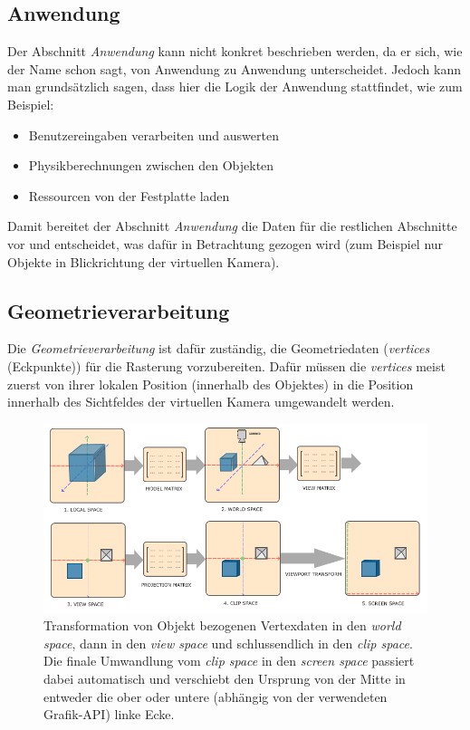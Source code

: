 \documentclass[oneside]{ausarbeitung}
\begin{document}
\subsection{Anwendung}
Der Abschnitt \textit{Anwendung} kann nicht konkret beschrieben werden, da er sich, wie der Name schon sagt, von Anwendung zu Anwendung unterscheidet. Jedoch kann man grundsätzlich sagen, dass hier die Logik der Anwendung stattfindet, wie zum Beispiel:
\begin{itemize}
\item{Benutzereingaben verarbeiten und auswerten}
\item{Physikberechnungen zwischen den Objekten}
\item{Ressourcen von der Festplatte laden}
\end{itemize}
Damit bereitet der Abschnitt \textit{Anwendung} die Daten für die restlichen Abschnitte vor und entscheidet, was dafür in Betrachtung gezogen wird (zum Beispiel nur Objekte in Blickrichtung der virtuellen Kamera).

\subsection{Geometrieverarbeitung}
Die \textit{Geometrieverarbeitung} ist dafür zuständig, die Geometriedaten (\textit{vertices} (Eckpunkte)) für die Rasterung vorzubereiten. Dafür müssen die \textit{vertices} meist zuerst von ihrer lokalen Position (innerhalb des Objektes) in die Position innerhalb des Sichtfeldes der virtuellen Kamera umgewandelt werden. 

\begin{figure}
    \includegraphics[width=\textwidth]{images/mvp_matrix.png}
    \caption{Transformation von Objekt bezogenen Vertexdaten in den \textit{world space}, dann in den \textit{view space} und schlussendlich in den \textit{clip space}. Die finale Umwandlung vom \textit{clip space} in den \textit{screen space} passiert dabei automatisch und verschiebt den Ursprung von der Mitte in entweder die ober oder untere (abhängig von der verwendeten Grafik-API) linke Ecke.}
    \label{fig:mvp_matrix}
\end{figure}
\end{document}
